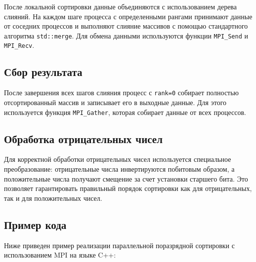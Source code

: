\documentclass[a4paper,12pt]{article}
\begin{document}
После локальной сортировки данные объединяются с использованием дерева слияний. На каждом шаге процесса с определенными рангами принимают данные от соседних процессов и выполняют слияние массивов с помощью стандартного алгоритма \texttt{std::merge}. Для обмена данными используются функции \texttt{MPI\_Send} и \texttt{MPI\_Recv}.

\subsection{Сбор результата}

После завершения всех шагов слияния процесс с \texttt{rank=0} собирает полностью отсортированный массив и записывает его в выходные данные. Для этого используется функция \texttt{MPI\_Gather}, которая собирает данные от всех процессов.

\subsection{Обработка отрицательных чисел}

Для корректной обработки отрицательных чисел используется специальное преобразование: отрицательные числа инвертируются побитовым образом, а положительные числа получают смещение за счет установки старшего бита. Это позволяет гарантировать правильный порядок сортировки как для отрицательных, так и для положительных чисел.

\subsection{Пример кода}

Ниже приведен пример реализации параллельной поразрядной сортировки с использованием MPI на языке C++:
\end{document}
